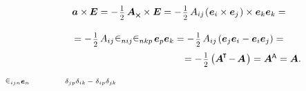 \begin{otherlanguage}{russian}
\nopagebreak\vspace{-0.1em}\[\begin{array}{c}
\bm{a} \times\hspace{-0.1ex} \bm{E} = - \hspace{.2ex} \smalldisplaystyleonehalf \hspace{.4ex} \bm{A}_{\Xcompanion} \times \bm{E} = - \hspace{.2ex} \smalldisplaystyleonehalf \, A_{ij} \hspace{-0.2ex}
\left( \hspace{.08ex} \tikzmark{beginFirstCrossProduct} {\bm{e}_i \times \bm{e}_j} \tikzmark{endFirstCrossProduct} \hspace{.16ex} \right)
\times \bm{e}_k \bm{e}_k = \\[1.5em]
%
= - \hspace{.2ex} \smalldisplaystyleonehalf \hspace{.32ex} A_{ij} \hspace{.12ex}
\tikzmark{beginTwoLeviCivitas} \levicivita_{nij} \levicivita_{nkp} \tikzmark{endTwoLeviCivitas}
\hspace{.32ex} \bm{e}_p \bm{e}_k = - \hspace{.2ex} \smalldisplaystyleonehalf \hspace{.32ex} A_{ij} \hspace{-0.1ex} \left( \bm{e}_j \bm{e}_i - \bm{e}_i \bm{e}_j \right) = \\[.8em]
%
\hspace{13.2em}= - \hspace{.2ex} \smalldisplaystyleonehalf \left({ \bm{A}^{\hspace{-0.1em}\T} \hspace{-0.25ex} - \hspace{-0.2ex} \bm{A} \hspace{0.2ex}}\right) = \bm{A}^{\mathsf{\hspace{-0.1ex}A}} = \bm{A}.
\end{array}\]
%
{${\scriptstyle \levicivita_{ijn} \bm{e}_n}$}
%
{${\scriptstyle \hspace{3.2em}\delta_{jp} \delta_{ik} \,-\; \delta_{ip} \delta_{jk}}$}


\end{otherlanguage}
